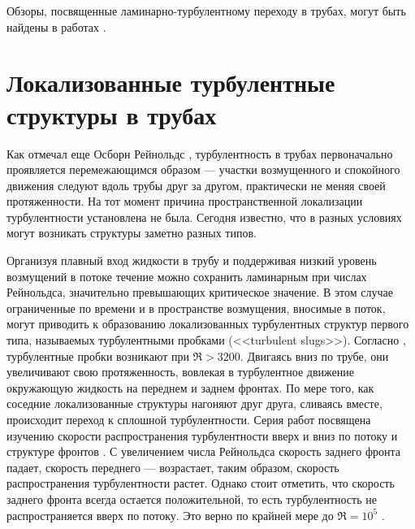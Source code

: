 Обзоры, посвященные ламинарно-турбулентному переходу в трубах, могут быть найдены в работах \cite{Kerswell2005, Eckhardt2007, Manneville2015, Manneville2016, Kreilos2014, Barkley2016}.



\section{Локализованные турбулентные структуры в трубах} \label{local_structures}

Как отмечал еще Осборн Рейнольдс \cite{Reynolds1883}, турбулентность в трубах первоначально проявляется перемежающимся образом --- участки возмущенного и спокойного движения следуют вдоль трубы друг за другом, практически не меняя своей протяженности. На тот момент причина пространственной локализации турбулентности установлена не была. Сегодня известно, что в разных условиях могут возникать структуры заметно разных типов. 

Организуя плавный вход жидкости в трубу и поддерживая низкий уровень возмущений в потоке течение можно сохранить ламинарным при числах Рейнольдса, значительно превышающих критическое значение. В этом случае ограниченные по времени и в пространстве возмущения, вносимые в поток, могут приводить к образованию локализованных турбулентных структур первого типа, называемых турбулентными пробками (<<turbulent slugs>>). Согласно \cite{Wygnanski1973}, турбулентные пробки возникают при $\Re > 3200$. Двигаясь вниз по трубе, они увеличивают свою протяженность, вовлекая в турбулентное движение окружающую жидкость на переднем и заднем фронтах. По мере того, как соседние локализованные структуры нагоняют друг друга, сливаясь вместе, происходит переход к сплошной турбулентности. Серия работ посвящена изучению скорости распространения турбулентности вверх и вниз по потоку и структуре фронтов \cite{Lindgren1969, Wygnanski1973, Nishi2008, Duguet2010, Barkley2015}. С увеличением числа Рейнольдса скорость заднего фронта падает, скорость переднего --- возрастает, таким образом, скорость распространения турбулентности растет. Однако стоит отметить, что скорость заднего фронта всегда остается положительной, то есть турбулентность не распространяется вверх по потоку. Это верно по крайней мере до $\Re = 10^5$ \cite{Wygnanski1973}. 

